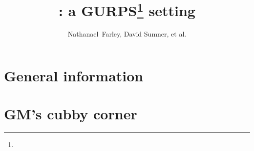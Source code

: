 


\title{: a GURPS\thanks{} setting}
\author{Nathanael~Farley, David Sumner, et al.}

\maketitle

\tableofcontents
\listoffigures

\part{General information}
\label{part:general-information}



\part{GM's cubby corner}
\label{part:gms-cubby-corner}





